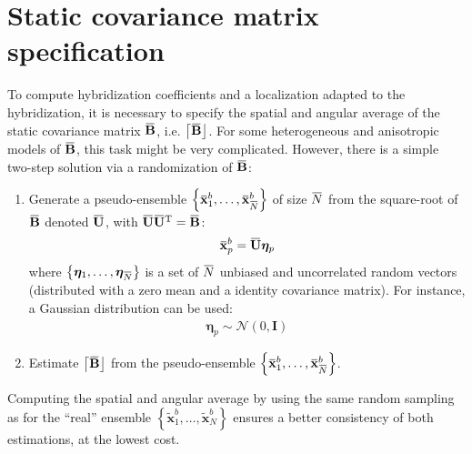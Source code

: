 \documentclass[12pt]{scrartcl}
\newcommand{\overbar}[1]{\mkern 1.5mu\overline{\mkern-1.5mu#1\mkern-1.5mu}\mkern 1.5mu}
\begin{document}
\clearpage

\section{Static covariance matrix specification}
To compute hybridization coefficients and a localization adapted to the hybridization, it is necessary to specify the spatial and angular average of the static covariance matrix $\overbar{\mathbf{B}}$, i.e. $\left\lceil \overbar{\mathbf{B}} \right\rfloor$. For some heterogeneous and anisotropic models of $\overbar{\mathbf{B}}$, this task might be very complicated. However, there is a simple two-step solution via a randomization of $\overbar{\mathbf{B}}$:
\begin{enumerate}
\item Generate a pseudo-ensemble $\left\{\overbar{\mathbf{x}}^b_1,\dots,\overbar{\mathbf{x}}^b_{\overbar{N}}\right\}$ of size $\overbar{N}$ from the square-root of $\overbar{\mathbf{B}}$ denoted $\overbar{\mathbf{U}}$, with $\overbar{\mathbf{U}} \overbar{\mathbf{U}}^\mathrm{T} = \overbar{\mathbf{B}}$:
\begin{align}
\overbar{\mathbf{x}}^b_p = \overbar{\mathbf{U}} \boldsymbol{\eta}_p
\end{align}
where $\left\{\boldsymbol{\eta}_1,\dots,\boldsymbol{\eta}_{\overbar{N}}\right\}$ is a set of $\overbar{N}$ unbiased and uncorrelated random vectors (distributed with a zero mean and a identity covariance matrix). For instance, a Gaussian distribution can be used:
\begin{align}
\boldsymbol{\eta}_p \sim \mathcal{N}\left(0,\mathbf{I}\right)
\end{align}
\item Estimate $\left\lceil \overbar{\mathbf{B}} \right\rfloor$ from the pseudo-ensemble $\left\{\overbar{\mathbf{x}}^b_1,\dots,\overbar{\mathbf{x}}^b_{\overbar{N}}\right\}$. 
\end{enumerate}
Computing the spatial and angular average by using the same random sampling as for the ``real'' ensemble $\left\{\widetilde{\mathbf{x}}^b_1,\dots,\widetilde{\mathbf{x}}^b_N\right\}$ ensures a better consistency of both estimations, at the lowest cost.

\clearpage



\end{document}
